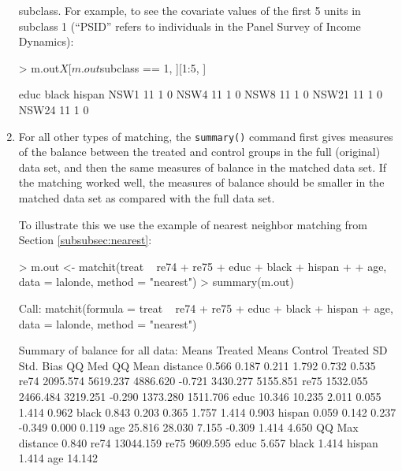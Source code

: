 \documentclass[oneside,letterpaper,titlepage]{article}
\begin{document}
\begin{enumerate}
subclass.  For example, to see the covariate values of the first 5
units in subclass 1 (``PSID'' refers to individuals in the Panel
Survey of Income Dynamics):
\begin{Schunk}
\begin{Sinput}
> m.out$X[m.out$subclass == 1, ][1:5, ]
\end{Sinput}
\begin{Soutput}
      educ black hispan
NSW1    11     1      0
NSW4    11     1      0
NSW8    11     1      0
NSW21   11     1      0
NSW24   11     1      0
\end{Soutput}
\end{Schunk}

\item For all other types of matching, the \texttt{summary()} command
  first gives measures of the balance between the treated and control
  groups in the full (original) data set, and then the same measures
  of balance in the matched data set.  If the matching worked well,
  the measures of balance should be smaller in the matched data set as
  compared with the full data set.
  
  To illustrate this we use the example of nearest neighbor matching
  from Section \ref{subsubsec:nearest}:
\begin{Schunk}
\begin{Sinput}
> m.out <- matchit(treat ~ re74 + re75 + educ + black + hispan + 
+     age, data = lalonde, method = "nearest")
> summary(m.out)
\end{Sinput}
\begin{Soutput}
Call:
matchit(formula = treat ~ re74 + re75 + educ + black + hispan + 
    age, data = lalonde, method = "nearest")

Summary of balance for all data:
         Means Treated Means Control Treated SD Std. Bias   QQ Med  QQ Mean
distance         0.566         0.187      0.211     1.792    0.732    0.535
re74          2095.574      5619.237   4886.620    -0.721 3430.277 5155.851
re75          1532.055      2466.484   3219.251    -0.290 1373.280 1511.706
educ            10.346        10.235      2.011     0.055    1.414    0.962
black            0.843         0.203      0.365     1.757    1.414    0.903
hispan           0.059         0.142      0.237    -0.349    0.000    0.119
age             25.816        28.030      7.155    -0.309    1.414    4.650
            QQ Max
distance     0.840
re74     13044.159
re75      9609.595
educ         5.657
black        1.414
hispan       1.414
age         14.142



\end{Soutput}
\end{Schunk}
\end{enumerate}
\end{document}
